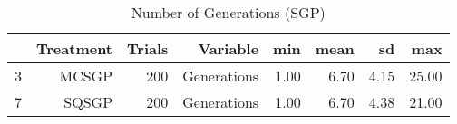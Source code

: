 \begin{table}[ht]
\centering
\begin{tabular}{rrrrrrrr}
  \hline
 & Treatment & Trials & Variable & min & mean & sd & max \\ 
  \hline
3 & MCSGP & 200 & Generations & 1.00 & 6.70 & 4.15 & 25.00 \\ 
  7 & SQSGP & 200 & Generations & 1.00 & 6.70 & 4.38 & 21.00 \\ 
   \hline
\end{tabular}
\caption{Number of Generations (SGP)} 
\end{table}
